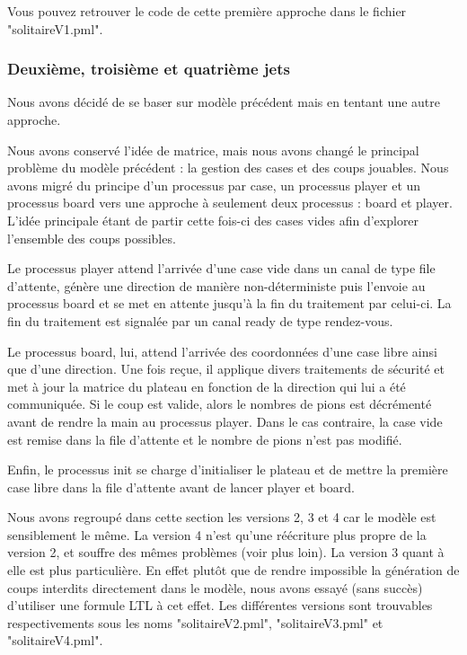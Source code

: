 \documentclass[12pt, a4paper]{report}
\begin{document}
Vous pouvez retrouver le code de cette première approche dans le fichier "solitaireV1.pml".

\subsubsection{Deuxième, troisième et quatrième jets}

Nous avons décidé de se baser sur modèle précédent mais en tentant une autre approche.

Nous avons conservé l'idée de matrice, mais nous avons changé le principal problème du modèle précédent : la gestion des cases et des coups jouables. Nous avons migré du principe d'un processus par case, un processus player et un processus board vers une approche à seulement deux processus : board et player. L'idée principale étant de partir cette fois-ci des cases vides afin d'explorer l'ensemble des coups possibles.

Le processus player attend l'arrivée d'une case vide dans un canal de type file d'attente, génère une direction de manière non-déterministe puis l'envoie au processus board et se met en attente jusqu'à la fin du traitement par celui-ci. La fin du traitement est signalée par un canal ready de type rendez-vous.

Le processus board, lui, attend l'arrivée des coordonnées d'une case libre ainsi que d'une direction. Une fois reçue, il applique divers traitements de sécurité et met à jour la matrice du plateau en fonction de la direction qui lui a été communiquée. Si le coup est valide, alors le nombres de pions est décrémenté avant de rendre la main au processus player. Dans le cas contraire, la case vide est remise dans la file d'attente et le nombre de pions n'est pas modifié.

Enfin, le processus init se charge d'initialiser le plateau et de mettre la première case libre dans la file d'attente avant de lancer player et board.

Nous avons regroupé dans cette section les versions 2, 3 et 4 car le modèle est sensiblement le même. La version 4 n'est qu'une réécriture plus propre de la version 2, et souffre des mêmes problèmes (voir plus loin). La version 3 quant à elle est plus particulière. En effet plutôt que de rendre impossible la génération de coups interdits directement dans le modèle, nous avons essayé (sans succès) d'utiliser une formule LTL à cet effet.
Les différentes versions sont trouvables respectivements sous les noms "solitaireV2.pml", "solitaireV3.pml" et "solitaireV4.pml".
\end{document}
